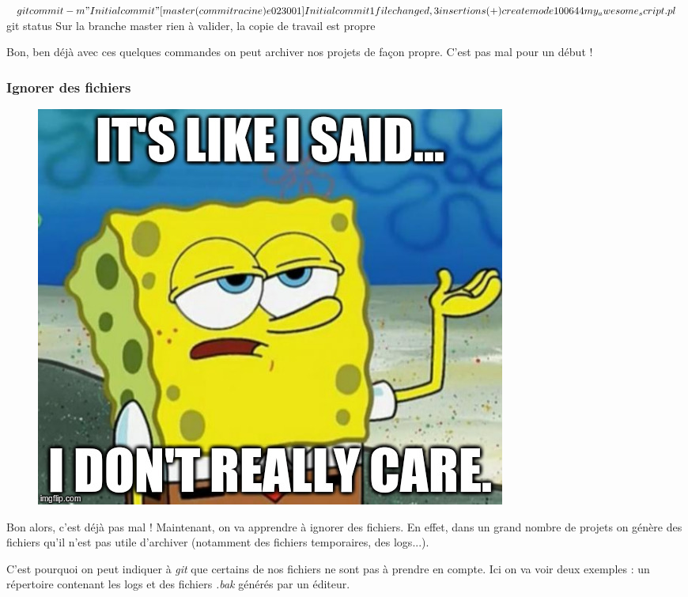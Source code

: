 \documentclass[12pt,a4paper]{article}
\begin{document}
{
\begin{boxedverbatim}
$ git commit -m "Initial commit"
[master (commit racine) e023001] Initial commit
 1 file changed, 3 insertions(+)
 create mode 100644 my_awesome_script.pl
$ git status
Sur la branche master
rien à valider, la copie de travail est propre
\end{boxedverbatim}
}

Bon, ben déjà avec ces quelques commandes on peut archiver nos projets de façon propre. C'est pas mal pour un début !


\subsubsection{Ignorer des fichiers}

\begin{figure}
\vspace*{-0.6\baselineskip}
\includegraphics[width=\linewidth]{dontcare}
\end{figure}

Bon alors, c'est déjà pas mal ! Maintenant, on va apprendre à ignorer des fichiers. En effet, dans un grand nombre de projets on génère des fichiers qu'il n'est pas utile d'archiver (notamment des fichiers temporaires, des logs...).

C'est pourquoi on peut indiquer à \emph{git} que certains de nos fichiers ne sont pas à prendre en compte. Ici on va voir deux exemples : un répertoire contenant les logs et des fichiers \emph{.bak} générés par un éditeur.
\end{document}
